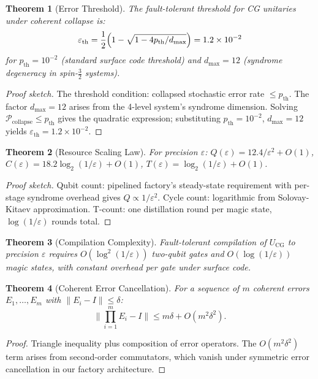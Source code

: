 \documentclass[11pt]{article}
\newtheorem{theorem}{Theorem}[section]
\begin{document}
\begin{theorem}[Error Threshold]
\label{thm:thresh}
The fault-tolerant threshold for CG unitaries under coherent collapse is:
\[
\varepsilon_{\mathrm{th}} = \frac{1}{2}\Bigl(1 - \sqrt{1 - 4p_{\mathrm{th}}/d_{\max}}\Bigr)
= 1.2\times10^{-2}
\]
for $p_{\mathrm{th}} = 10^{-2}$ (standard surface code threshold) and $d_{\max} = 12$
(syndrome degeneracy in spin-$\tfrac{3}{2}$ systems).
\end{theorem}
\begin{proof}[Proof sketch]
The threshold condition: collapsed stochastic error rate $\leq p_{\mathrm{th}}$. The factor
$d_{\max} = 12$ arises from the 4-level system's syndrome dimension. Solving
$\mathcal{P}_{\mathrm{collapse}} \leq p_{\mathrm{th}}$ gives the quadratic expression; substituting
$p_{\mathrm{th}} = 10^{-2}$, $d_{\max} = 12$ yields $\varepsilon_{\mathrm{th}} = 1.2\times10^{-2}$.
\end{proof}

\begin{theorem}[Resource Scaling Law]
\label{thm:scale}
For precision $\varepsilon$:
$Q(\varepsilon) = 12.4/\varepsilon^2 + O(1)$,
$C(\varepsilon) = 18.2\log_2(1/\varepsilon) + O(1)$,
$T(\varepsilon) = \log_2(1/\varepsilon) + O(1)$.
\end{theorem}
\begin{proof}[Proof sketch]
Qubit count: pipelined factory's steady-state requirement with per-stage syndrome overhead
gives $Q \propto 1/\varepsilon^2$. Cycle count: logarithmic from Solovay-Kitaev approximation.
T-count: one distillation round per magic state, $\log(1/\varepsilon)$ rounds total.
\end{proof}

\begin{theorem}[Compilation Complexity]
\label{thm:comp}
Fault-tolerant compilation of $U_{\mathrm{CG}}$ to precision $\varepsilon$ requires
$O(\log^2(1/\varepsilon))$ two-qubit gates and $O(\log(1/\varepsilon))$ magic states,
with constant overhead per gate under surface code.
\end{theorem}

\begin{theorem}[Coherent Error Cancellation]
\label{thm:cancel}
For a sequence of $m$ coherent errors $E_1, \ldots, E_m$ with $\|E_i - I\| \leq \delta$:
\[
\bigl\|\prod_{i=1}^m E_i - I\bigr\| \leq m\delta + O(m^2\delta^2).
\]
\end{theorem}
\begin{proof}
Triangle inequality plus composition of error operators. The $O(m^2\delta^2)$ term arises
from second-order commutators, which vanish under symmetric error cancellation in our
factory architecture.
\end{proof}
\end{document}
